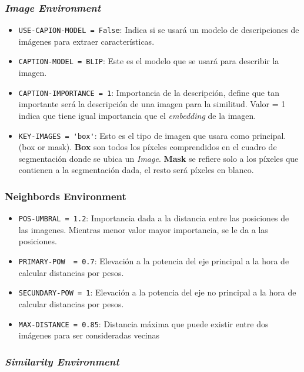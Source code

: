 \subsubsection*{\textit{Image Environment}}
\begin{itemize}
\item \verb|USE-CAPION-MODEL = False|: Indica si se usar\'a un modelo de descripciones de im\'agenes para extraer caracter\'isticas.
\item \verb|CAPTION-MODEL = BLIP|: Este es el modelo que se usar\'a para describir la imagen.
\item \verb|CAPTION-IMPORTANCE = 1|: Importancia de la descripci\'on, define que tan importante ser\'a la descripci\'on de una imagen para la similitud. Valor = 1 indica que tiene igual importancia que el \textit{embedding} de la imagen.
\item \verb|KEY-IMAGES = 'box'|: Esto es el tipo de imagen que usara como principal. (box or mask). \textbf{Box} son todos los p\'ixeles comprendidos en el cuadro de segmentaci\'on donde se ubica un \textit{Image}. \textbf{Mask} se refiere solo a los p\'ixeles que contienen a la segmentaci\'on dada, el resto ser\'a p\'ixeles en blanco.
\end{itemize}


\subsubsection*{Neighbords Environment}
\begin{itemize}
\item \verb|POS-UMBRAL = 1.2|: Importancia dada a la distancia entre las posiciones de las imagenes. Mientras menor valor mayor importancia, se le da a las posiciones.
\item \verb|PRIMARY-POW  = 0.7|: Elevaci\'on a la potencia del eje principal a la hora de calcular distancias por pesos.
\item \verb|SECUNDARY-POW = 1|: Elevaci\'on a la potencia del eje no principal a la hora de calcular distancias por pesos.
\item \verb|MAX-DISTANCE = 0.85|: Distancia m\'axima que puede existir entre dos im\'agenes para ser consideradas vecinas
\end{itemize}

\subsubsection*{\textit{Similarity Environment}}

